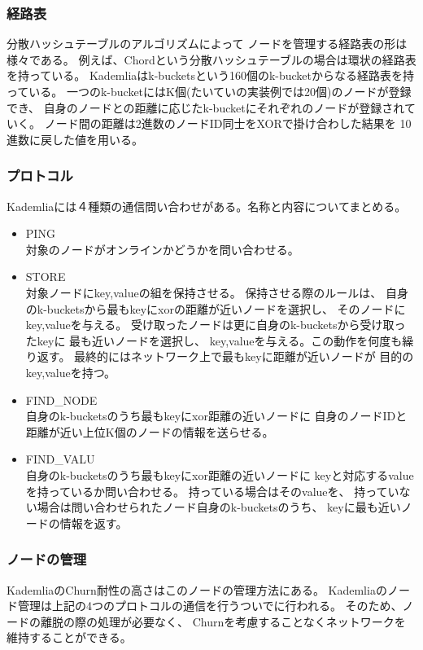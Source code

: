 \documentclass[sotsuron]{jcsie}
\begin{document}
\subsubsection{経路表}
分散ハッシュテーブルのアルゴリズムによって
ノードを管理する経路表の形は様々である。
例えば、Chordという分散ハッシュテーブルの場合は環状の経路表を持っている。
Kademliaはk-bucketsという160個のk-bucketからなる経路表を持っている。
一つのk-bucketにはK個(たいていの実装例では20個)のノードが登録でき、
自身のノードとの距離に応じたk-bucketにそれぞれのノードが登録されていく。
ノード間の距離は2進数のノードID同士をXORで掛け合わした結果を
10進数に戻した値を用いる。
\subsubsection{プロトコル}
Kademliaには４種類の通信問い合わせがある。名称と内容についてまとめる。
\begin{itemize}
	\item {PING}\\
	      対象のノードがオンラインかどうかを問い合わせる。\\
	\item {STORE}\\
	      対象ノードにkey,valueの組を保持させる。
	      保持させる際のルールは、
	      自身のk-bucketsから最もkeyにxorの距離が近いノードを選択し、
	      そのノードにkey,valueを与える。
	      受け取ったノードは更に自身のk-bucketsから受け取ったkeyに
	      最も近いノードを選択し、
	      key,valueを与える。この動作を何度も繰り返す。
	      最終的にはネットワーク上で最もkeyに距離が近いノードが
	      目的のkey,valueを持つ。\\	      
	\item {FIND\_NODE}\\
	      自身のk-bucketsのうち最もkeyにxor距離の近いノードに
	      自身のノードIDと距離が近い上位K個のノードの情報を送らせる。\\	      
	\item {FIND\_VALU}\\
	      自身のk-bucketsのうち最もkeyにxor距離の近いノードに
	      keyと対応するvalueを持っているか問い合わせる。
	      持っている場合はそのvalueを、
	      持っていない場合は問い合わせられたノード自身のk-bucketsのうち、
	      keyに最も近いノードの情報を返す。\\
\end{itemize}

\subsubsection{ノードの管理}
KademliaのChurn耐性の高さはこのノードの管理方法にある。
Kademliaのノード管理は上記の4つのプロトコルの通信を行うついでに行われる。
そのため、ノードの離脱の際の処理が必要なく、
Churnを考慮することなくネットワークを維持することができる。
\end{document}
